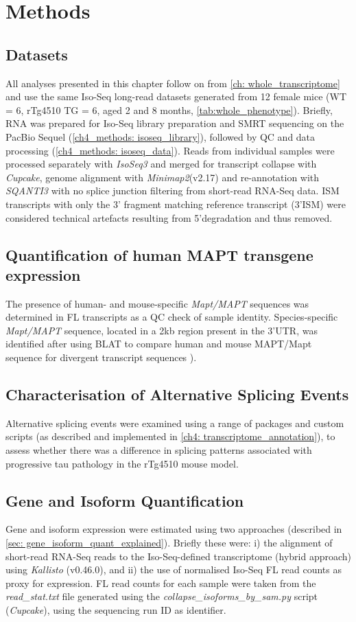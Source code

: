 \newpage
\section{Methods}

\subsection{Datasets}
All analyses presented in this chapter follow on from \cref{ch: whole_transcriptome} and use the same Iso-Seq long-read datasets generated from 12 female mice (WT = 6, rTg4510 TG = 6, aged 2 and 8 months, \cref{tab:whole_phenotype}). Briefly, RNA was prepared for Iso-Seq library preparation and SMRT sequencing on the PacBio Sequel (\cref{ch4_methods: isoseq_library}), followed by QC and data processing (\cref{ch4_methods: isoseq_data}). Reads from individual samples were processed separately with \textit{IsoSeq3} and merged for transcript collapse with \textit{Cupcake}, genome alignment with \textit{Minimap2}(v2.17) and re-annotation with \textit{SQANTI3} with no splice junction filtering from short-read RNA-Seq data. ISM transcripts with only the 3' fragment matching reference transcript (3'ISM) were considered technical artefacts resulting from 5'degradation and thus removed.  

\subsection{Quantification of human MAPT transgene expression} 
The presence of human- and mouse-specific \textit{Mapt/MAPT} sequences was determined in FL transcripts as a QC check of sample identity. Species-specific \textit{Mapt/MAPT} sequence, located in a 2kb region present in the 3'UTR, was identified after using BLAT\cite{Kent2002} to compare human and mouse MAPT/Mapt sequence for divergent transcript sequences \cite{Castanho2020}).  

\subsection{Characterisation of Alternative Splicing Events} 
Alternative splicing events were examined using a range of packages and custom scripts (as described and implemented in \cref{ch4: transcriptome_annotation}), to assess whether there was a difference in splicing patterns associated with progressive tau pathology in the rTg4510 mouse model. 

\subsection{Gene and Isoform Quantification}
Gene and isoform expression were estimated using two approaches (described in \cref{sec: gene_isoform_quant_explained}). Briefly these were: i) the alignment of short-read RNA-Seq reads to the Iso-Seq-defined transcriptome (hybrid approach) using \textit{Kallisto}\cite{Bray2016} (v0.46.0), and ii) the use of normalised Iso-Seq FL read counts as proxy for expression. FL read counts for each sample were taken from the \textit{read\_stat.txt} file generated using the \textit{collapse\_isoforms\_by\_sam.py} script (\textit{Cupcake}), using the sequencing run ID as identifier. 

